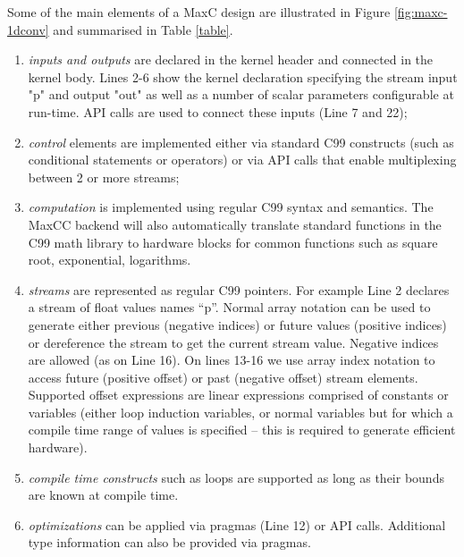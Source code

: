 Some of the main elements of a MaxC design are illustrated in Figure
\ref{fig:maxc-1dconv} and summarised in Table \ref{table}.

\begin{enumerate}
\item \emph{inputs and outputs} are declared in the kernel header and
  connected in the kernel body. Lines 2-6 show the kernel declaration
  specifying the stream input "p" and output "out" as well as a number
  of scalar parameters configurable at run-time. API calls are used to
  connect these inputs (Line 7 and 22);

\item \emph{control} elements are implemented either via standard C99
  constructs (such as conditional statements or operators) or via API
  calls that enable multiplexing between 2 or more streams;

\item \emph{computation} is implemented using regular C99 syntax and
  semantics. The MaxCC backend will also automatically translate
  standard functions in the C99 math library to hardware blocks for
  common functions such as square root, exponential, logarithms.

\item \emph{streams} are represented as regular C99 pointers. For
  example Line 2 declares a stream of float values names ``p''.
  Normal array notation can be used to generate either previous
  (negative indices) or future values (positive indices) or
  dereference the stream to get the current stream value. Negative
  indices are allowed (as on Line 16). On lines 13-16 we use array
  index notation to access future (positive offset) or past (negative
  offset) stream elements. Supported offset expressions are linear
  expressions comprised of constants or variables (either loop
  induction variables, or normal variables but for which a compile
  time range of values is specified -- this is required to generate
  efficient hardware).

\item \emph{compile time constructs} such as loops are supported as
  long as their bounds are known at compile time.

\item \emph{optimizations} can be applied via pragmas (Line 12) or API
  calls. Additional type information can also be provided via pragmas.

\end{enumerate}

